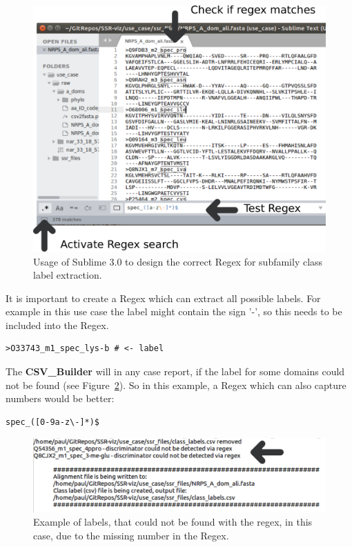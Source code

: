 \documentclass[a4paper,10pt]{article}
\begin{document}
\begin{figure}
  \includegraphics[width=\linewidth]{./figs/subl_regex}
  \caption{Usage of Sublime 3.0 to design the correct Regex for subfamily class label extraction.}
  \label{fig:subl_regex}
\end{figure}

It is important to create a Regex which can extract all possible labels. For example in this use case the
label might contain the sign '-', so this needs to be included into the Regex. 

\begin{verbatim}
>O33743_m1_spec_lys-b # <- label
\end{verbatim}

The \textbf{CSV\_Builder}
will in any case report, if the label for some domains could not be found (see Figure~\ref{fig:regex_fail}).
So in this example, a Regex which can also capture numbers would be better:

\begin{verbatim} 
spec_([0-9a-z\-]*)$
\end{verbatim}


\begin{figure}
  \includegraphics[width=\linewidth]{./figs/regex_fail}
  \caption{Example of labels, that could not be found with the regex, in this case, due to the missing number in the Regex.}
  \label{fig:regex_fail}
\end{figure}
\end{document}
